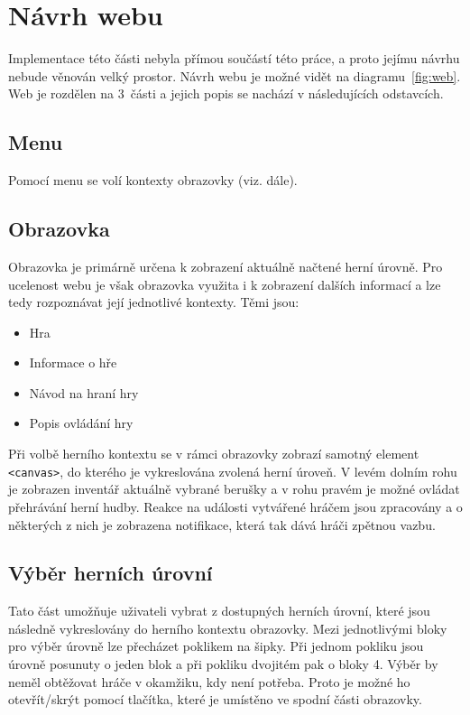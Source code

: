 \section{Návrh webu}
Implementace této části nebyla přímou součástí této práce, a proto jejímu návrhu nebude věnován velký prostor. Návrh webu je možné vidět na diagramu~\ref{fig:web}. Web je rozdělen na 3~části a jejich popis se nachází v následujících odstavcích.


\subsection*{Menu}
Pomocí menu se volí kontexty obrazovky (viz. dále).
\subsection*{Obrazovka} Obrazovka je primárně určena k zobrazení aktuálně načtené herní úrovně. Pro ucelenost webu je však obrazovka využita i k zobrazení dalších informací a lze tedy rozpoznávat její jednotlivé kontexty. Těmi jsou:
	\begin{itemize}
	\item Hra

\item Informace o hře
\item Návod na hraní hry
\item Popis ovládání hry
	\end{itemize}
Při volbě herního kontextu se v rámci obrazovky zobrazí samotný element \texttt{<canvas>}, do kterého je vykreslována zvolená herní úroveň. V levém dolním rohu je zobrazen inventář aktuálně vybrané berušky a v rohu pravém je možné ovládat přehrávání herní hudby. Reakce na události vytvářené hráčem jsou zpracovány a o některých z nich je zobrazena notifikace, která tak dává hráči zpětnou vazbu. 
\subsection*{Výběr herních úrovní}
Tato část umožňuje uživateli vybrat z dostupných herních úrovní, které jsou následně vykreslovány do herního kontextu obrazovky. Mezi jednotlivými bloky pro výběr úrovně lze přecházet poklikem na šipky. Při jednom pokliku jsou úrovně posunuty o jeden blok a při pokliku dvojitém pak o bloky 4. Výběr by neměl obtěžovat hráče v okamžiku, kdy není potřeba. Proto je možné ho otevřít/skrýt pomocí tlačítka, které je umístěno ve spodní části obrazovky.


